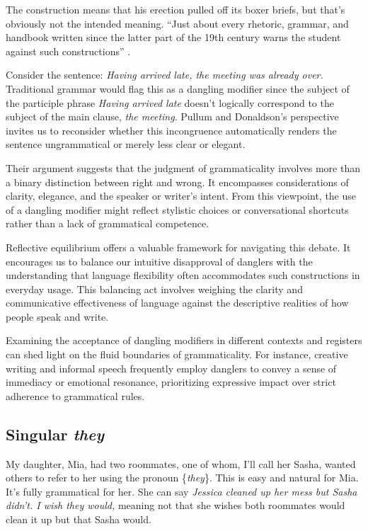 The construction means that his erection pulled off its boxer briefs, but that's obviously not the intended meaning. \enquote{Just about every rhetoric, grammar, and handbook written since the latter part of the 19th century warns the student against such constructions} \citep[314]{Gilman1989}.

Consider the sentence: \textit{Having arrived late, the meeting was already over.} Traditional grammar would flag this as a dangling modifier since the subject of the participle phrase \textit{Having arrived late} doesn't logically correspond to the subject of the main clause, \textit{the meeting}. Pullum and Donaldson's perspective invites us to reconsider whether this incongruence automatically renders the sentence ungrammatical or merely less clear or elegant.

Their argument suggests that the judgment of grammaticality involves more than a binary distinction between right and wrong. It encompasses considerations of clarity, elegance, and the speaker or writer's intent. From this viewpoint, the use of a dangling modifier might reflect stylistic choices or conversational shortcuts rather than a lack of grammatical competence.

Reflective equilibrium offers a valuable framework for navigating this debate. It encourages us to balance our intuitive disapproval of danglers with the understanding that language flexibility often accommodates such constructions in everyday usage. This balancing act involves weighing the clarity and communicative effectiveness of language against the descriptive realities of how people speak and write.

Examining the acceptance of dangling modifiers in different contexts and registers can shed light on the fluid boundaries of grammaticality. For instance, creative writing and informal speech frequently employ danglers to convey a sense of immediacy or emotional resonance, prioritizing expressive impact over strict adherence to grammatical rules.

\subsection{Singular \textit{they}}

My daughter, Mia, had two roommates, one of whom, I'll call her Sasha, wanted others to refer to her using the pronoun \{\textit{they}\}. This is easy and natural for Mia. It's fully grammatical for her. She can say \textit{Jessica cleaned up her mess but Sasha didn't. I wish they would,} meaning not that she wishes both roommates would clean it up but that Sasha would.

